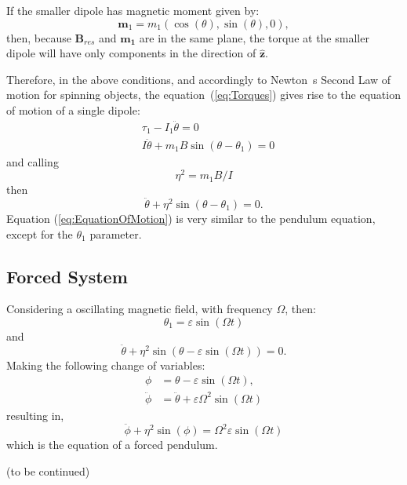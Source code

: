 If the smaller dipole has magnetic moment given by:
\begin{equation}
    \boldsymbol{m}_1 = m_1 (\cos(\theta), \sin(\theta), 0),
    \label{eq:MagneticMoment}
\end{equation}
then, because $\boldsymbol{B}_{res}$ and $\boldsymbol{m_1}$ are in the same plane, the torque at the smaller dipole will have only components in the direction of $\boldsymbol{\hat{z}}$.

Therefore, in the above conditions, and accordingly to Newton~\textquotesingle s Second Law of motion for spinning objects, the equation~(\ref{eq:Torques}) gives rise to the equation of motion of a single dipole:
\begin{equation}
    \begin{aligned}
        &\tau_1 - I_1 \ddot{\theta} = 0\\
        &I \ddot{\theta} + m_1 B \sin(\theta - \theta_1) = 0        
    \end{aligned}
\end{equation}
and calling
\begin{equation}
    \eta^2 = m_1 B/I 
\end{equation} 
then
\begin{equation}
    \ddot{\theta} +\eta^2 \sin(\theta - \theta_1) = 0.
    \label{eq:EquationOfMotion}
\end{equation}
Equation (\ref{eq:EquationOfMotion}) is very similar to the pendulum equation, except for the $\theta_1$ parameter.

\subsection{Forced System}

Considering a oscillating magnetic field, with frequency $\Omega$, then:
\begin{equation}
    \theta_1 = \varepsilon \sin(\Omega t)
\end{equation}
and
\begin{equation}
    \ddot{\theta} +\eta^2 \sin(\theta - \varepsilon \sin(\Omega t)) = 0.
\end{equation}
Making the following change of variables:
\begin{equation}
    \begin{aligned}
        \phi &= \theta - \varepsilon \sin(\Omega t),\\
        \ddot{\phi} &= \ddot{\theta} + \varepsilon \Omega^2 \sin(\Omega t)
    \end{aligned}
\end{equation}
resulting in, 
\begin{equation}
    \ddot{\phi} + \eta^2 \sin(\phi) =\Omega^2 \varepsilon \sin(\Omega t)
\end{equation}
which is the equation of a forced pendulum.

(to be continued)
